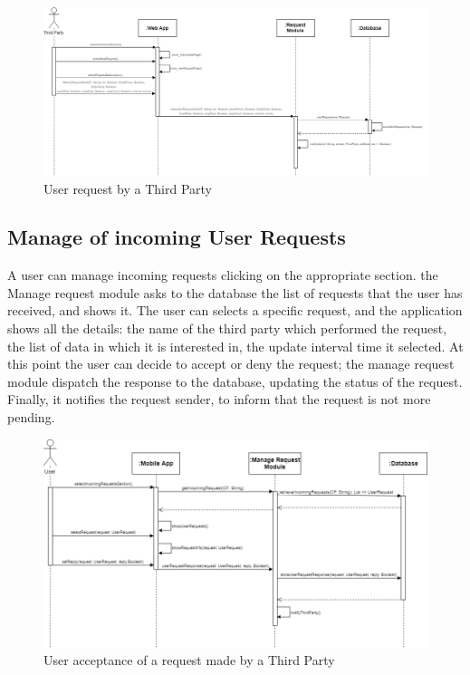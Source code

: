 \begin{figure}[H]
    \centering
    \includegraphics[scale=0.35]{DD/Pictures/userRequest.png}
    \caption{User request by a Third Party}
\end{figure}
\subsection{Manage of incoming User Requests}
A user can manage incoming requests clicking on the appropriate section. the Manage request module asks to the database the list of requests that the user has received, and shows it. The user can selects a specific request, and the application shows all the details:
the name of the third party which performed the request, the list of data in which it is interested in, the update interval time it selected. At this point the user can decide to accept or deny the request; the manage request module dispatch the response to the database, updating the status of the request. Finally, it notifies the request sender, to inform that the request is not more pending. 

\begin{figure}[H]
    \centering
    \includegraphics[scale=0.35]{DD/Pictures/acceptRequest.png}
    \caption{User acceptance of a request made by a Third Party}
\end{figure}
